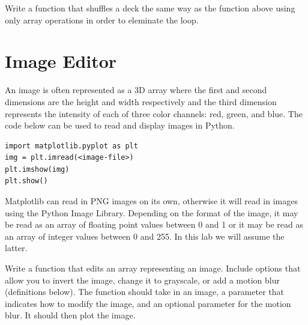 \begin{problem}
Write a function that shuffles a deck the same way as the function above using only array operations in order to eleminate the loop.
\end{problem}

\section*{Image Editor}
An image is often represented as a 3D array where the first and second dimensions are the height and width respectively and the third dimension represents the intensity of each of three color channels: red, green, and blue.
The code below can be used to read and display images in Python.
\begin{lstlisting}
import matplotlib.pyplot as plt
img = plt.imread(<image-file>)
plt.imshow(img)
plt.show()
\end{lstlisting}

Matplotlib can read in PNG images on its own, otherwise it will read in images using the Python Image Library.
Depending on the format of the image, it may be read as an array of floating point values between 0 and 1 or it may be read as an array of integer values between 0 and 255.
In this lab we will assume the latter.

\begin{problem}
Write a function that edits an array representing an image.
Include options that allow you to  invert the image, change it to grayscale, or add a motion blur (definitions below).
The function should take in an image, a parameter that indicates how to modify the image, and an optional parameter for the motion blur.
It should then plot the image.
\end{problem}


